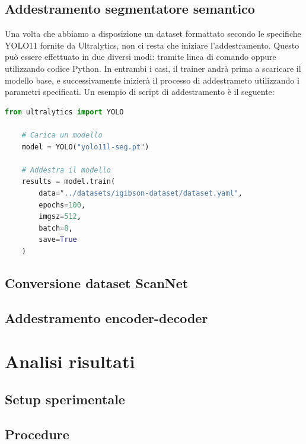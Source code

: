 \documentclass[12pt]{report}
\begin{document}
\section{Addestramento segmentatore semantico}
\label{chap:addestramento_segmentatore_semantico}

Una volta che abbiamo a disposizione un dataset formattato secondo le specifiche YOLO11 fornite da Ultralytics, non ci resta che iniziare l'addestramento. Questo può essere effettuato in due diversi modi: tramite linea di comando oppure utilizzando codice Python. In entrambi i casi, il trainer andrà prima a scaricare il modello base, e successivamente inizierà il processo di addestrameto utilizzando i parametri specificati. Un esempio di script di addestramento è il seguente:

\lstset{style=pythonstyle}
\begin{lstlisting}[language=Python, caption={Un esempio di codice Python per addestrare un modello YOLO11}, label={lst:addestramentoyolo}, float]
	from ultralytics import YOLO
	
	# Carica un modello
	model = YOLO("yolo11l-seg.pt")
	
	# Addestra il modello
	results = model.train(
		data="../datasets/igibson-dataset/dataset.yaml",
		epochs=100,
		imgsz=512,
		batch=8,
		save=True
	)
\end{lstlisting}

\section{Conversione dataset ScanNet}
\label{chap:conversione_dataset_scannet}

\section{Addestramento encoder-decoder}
\label{chap:addestramento_encoder_decoder}

\chapter{Analisi risultati}
\label{chap:analisi}

\section{Setup sperimentale}
\label{chap:setup}

\section{Procedure}
\label{procedure}
\end{document}

